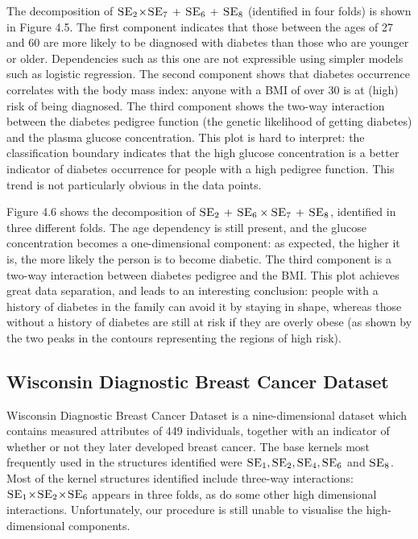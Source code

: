 \documentclass[a4paper,12pt ]{report}
\newcommand{\kerntimes}{ \! \times \!}
\newcommand{\kernplus}{ \, + \,}
\begin{document}
The decomposition of $\SE_2\kerntimes\SE_7 \kernplus \SE_6 \kernplus \SE_8$ (identified in four folds) is shown in Figure 4.5. The first component indicates that those between the ages of 27 and 60 are more likely to be diagnosed with diabetes than those who are younger or older. Dependencies such as this one are not expressible using simpler models such as logistic regression. The second component shows that diabetes occurrence correlates with the body mass index: anyone with a BMI of over 30 is at (high) risk of being diagnosed. The third component shows the two-way interaction between the diabetes pedigree function (the genetic likelihood of getting diabetes) and the plasma glucose concentration. This plot is hard to interpret: the classification boundary indicates that the high glucose concentration is a better indicator of diabetes occurrence for people with a high pedigree function. This trend is not particularly obvious in the data points.

Figure 4.6 shows the decomposition of $ \SE_2 \kernplus \SE_6 \times \SE_7 \kernplus \SE_8$, identified in three different folds. The age dependency is still present, and the glucose concentration becomes a one-dimensional component: as expected, the higher it is, the more likely the person is to become diabetic. The third component is a two-way interaction between diabetes pedigree and the BMI. This plot achieves great data separation, and leads to an interesting conclusion: people with a history of diabetes in the family can avoid it by staying in shape, whereas those without a history of diabetes are still at risk if they are overly obese (as shown by the two peaks in the contours representing the regions of high risk).



\subsection{Wisconsin Diagnostic Breast Cancer Dataset}

Wisconsin Diagnostic Breast Cancer Dataset is a nine-dimensional dataset which contains measured attributes of 449 individuals, together with an indicator of whether or not they later developed breast cancer. The base kernels most frequently used in the structures identified were $\textsc{SE}_1, \textsc{SE}_2, \textsc{SE}_4, \textsc{SE}_6$ and $\textsc{SE}_8$. Most of the kernel structures identified include three-way interactions: $\SE_1 \kerntimes \SE_2 \kerntimes \SE_6$ appears in three folds, as do some other high dimensional interactions. Unfortunately, our procedure is still unable to visualise the high-dimensional components.
\end{document}
